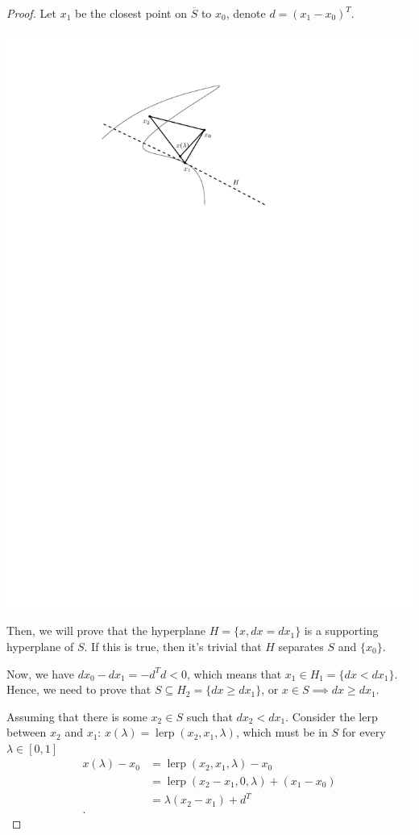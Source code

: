 \begin{proof}
  Let \( x_{1} \) be the closest point on \( \overline{S} \) to \( x_{0} \),
  denote \( d = (x_{1}-x_{0})^{T}\).

  \includegraphics[scale=1.5]{figures/1696779691}

  Then, we will prove that the hyperplane \( H = \{x, dx = dx_{1}\}   \) is a
  supporting hyperplane of \( S \). If this is true, then it's trivial that \( H
  \) separates \( S \) and \( \{x_{0}\}   \).

  Now, we have \( dx_{0}-dx_{1}=-d^{T}d < 0 \), which means that \( x_{1} \in
  H_{1} = \{dx < dx_{1}\}   \). Hence, we need to prove that \( S \subseteq
  H_{2} = \{dx \ge  dx_{1}\}   \), or \( x \in S \implies dx \ge  dx_{1} \).

  Assuming that there is some \( x_{2} \in S \) such that \( dx_{2} < dx_{1} \).
  Consider the lerp between \( x_{2} \) and \( x_{1} \): \( x(\lambda) =
  \operatorname{lerp}(x_{2}, x_{1}, \lambda) \), which must be in \( S \) for
  every \( \lambda \in [0, 1] \)
  \begin{align*}
    x(\lambda) - x_{0} &= \operatorname{lerp}(x_{2}, x_{1}, \lambda) -
    x_{0}\\
                       &= \operatorname{lerp}(x_{2}-x_{1}, 0, \lambda) + (x_{1}
                       - x_{0})\\
                       &= \lambda(x_{2}-x_{1}) + d^{T}\\
  .\end{align*}


\end{proof}
